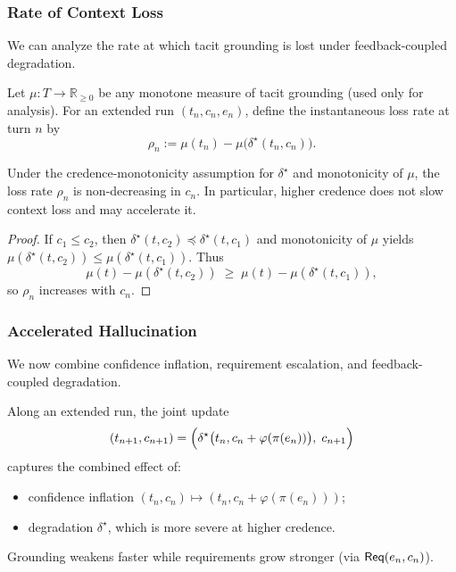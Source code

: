 \subsubsection{Rate of Context Loss}

We can analyze the rate at which tacit grounding is lost under
feedback-coupled degradation.

\begin{definition}
Let \(\mu : T \to \mathbb{R}_{\ge 0}\) be any monotone measure of tacit
grounding (used only for analysis). For an extended run
\((t_n,c_n,e_n)\), define the instantaneous loss rate at turn \(n\) by
\[
\rho_n := \mu(t_n) - \mu\bigl(\delta^\star(t_n,c_n)\bigr).
\]
\end{definition}

\begin{proposition}
Under the credence-monotonicity assumption for \(\delta^\star\) and
monotonicity of \(\mu\), the loss rate \(\rho_n\) is non-decreasing in
\(c_n\). In particular, higher credence does not slow context loss and
may accelerate it.
\end{proposition}

\begin{proof}
If \(c_1 \le c_2\), then
\(\delta^\star(t,c_2) \preceq \delta^\star(t,c_1)\) and
monotonicity of \(\mu\) yields
\(\mu(\delta^\star(t,c_2)) \le \mu(\delta^\star(t,c_1))\). Thus
\[
\mu(t) - \mu(\delta^\star(t,c_2))
\;\ge\;
\mu(t) - \mu(\delta^\star(t,c_1)),
\]
so \(\rho_n\) increases with \(c_n\).
\end{proof}

\subsubsection{Accelerated Hallucination}

We now combine confidence inflation, requirement escalation, and
feedback-coupled degradation.

\begin{definition}
Along an extended run, the joint update
\[
(t_{n+1}, c_{n+1})
 =
\Bigl(
  \delta^\star\bigl( t_n, c_n + \varphi(\pi(e_n))\bigr),\;
  c_{n+1}
\Bigr)
\]
captures the combined effect of:
\begin{itemize}
  \item confidence inflation
        \((t_n, c_n) \mapsto (t_n, c_n + \varphi(\pi(e_n)))\);
  \item degradation \(\delta^\star\), which is more severe at higher
        credence.
\end{itemize}
Grounding weakens faster while requirements grow stronger (via
\(\mathsf{Req}(e_n,c_n)\)).
\end{definition}

